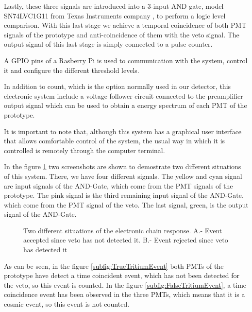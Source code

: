 Lastly, these three signals are introduced into a 3-input AND gate, model SN74LVC1G11 from Texas Instruments company \cite{ANDGate}, to perform a logic level comparison. With this last stage we achieve a temporal coincidence of both PMT signals of the prototype and anti-coincidence of them with the veto signal. The output signal of this last stage is simply connected to a pulse counter. 

A GPIO pins of a Rasberry Pi is used to communication with the system, control it and configure the different threshold levels. 

In addition to count, which is the option normally used in our detector, this electronic system include a voltage follower circuit connected to the preamplifier output signal which can be used to obtain a energy spectrum of each PMT of the prototype.

It is important to note that, although this system has a graphical user interface that allows comfortable control of the system, the usual way in which it is controlled is remotely through the computer terminal.

In the figure \ref{fig:ScreenshotElectronic} two screenshots are shown to demostrate two different situations of this system. There, we have four different signals. The yellow and cyan signal are input signals of the AND-Gate, which come from the PMT signals of the prototype. The pink signal is the third remaining input signal of the AND-Gate, which come from the PMT signal of the veto. The last signal, green, is the output signal of the AND-Gate.

\begin{figure}[h]
 \centering
 \caption{Two different situations of the electronic chain response. A.- Event accepted since veto has not detected it. B.- Event rejected since veto has detected it}
 \label{fig:ScreenshotElectronic}
\end{figure}

As can be seen, in the figure \ref{subfig:TrueTritiumEvent} both PMTs of the prototype have detect a time coincident event, which has not been detected for the veto, so this event is counted. In the figure \ref{subfig:FalseTritiumEvent}, a time coincidence event has been observed in the three PMTs, which means that it is a cosmic event, so this event is not counted.

